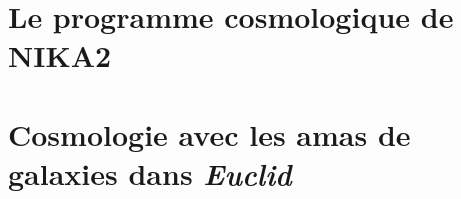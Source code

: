 \documentclass[a4paper, 12pt]{report}
\begin{document}
%
%
\chapter{Le programme cosmologique de NIKA2}
\label{se:cosmo_NIKA2}


%
%
\chapter{Cosmologie avec les amas de galaxies dans \emph{Euclid}}
\label{se:cosmo_euclid}




%


\end{document}
